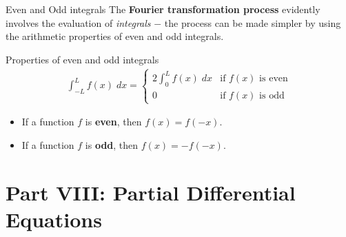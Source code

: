 \begin{frame}{Even and Odd integrals}
    The \textbf{Fourier transformation process} evidently involves the evaluation of \textit{integrals} \(-\) the process can be made simpler by using the arithmetic properties of even and odd integrals.
    
    \begin{block}{Properties of even and odd integrals}
        \begin{align*}
            \int_{-L}^L f(x) \;dx =
            \begin{cases}
                \displaystyle 2 \int_0^L f(x)\;dx & \text{if } f(x) \text{ is even} \\
                0 & \text{if } f(x) \text{ is odd}
            \end{cases}
        \end{align*}
        
        \begin{itemize}
            \item If a function \(f\) is \textbf{even}, then \(f(x) = f(-x)\).
            \item If a function \(f\) is \textbf{odd}, then \(f(x) = -f(-x)\).
        \end{itemize}
    \end{block}
\end{frame}
\section[Part VIII: PDEs]{Part VIII: Partial Differential Equations}

